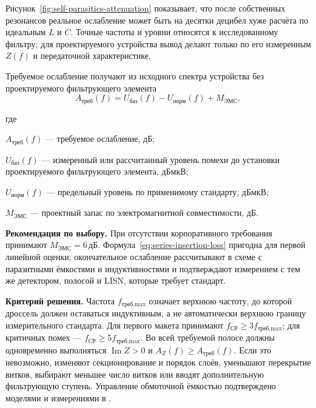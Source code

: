 \documentclass[14pt,a4paper]{extarticle}
\newcommand{\recommend}{\par\noindent\textbf{Рекомендация по выбору.} }
\newcommand{\criterion}{\par\noindent\textbf{Критерий решения.} }
\newenvironment{whereblock}
 {\par\noindent где\par
  \begin{list}{}{\setlength{\leftmargin}{12.5mm}
                  \setlength{\itemindent}{-12.5mm}
                  \setlength{\itemsep}{0pt}
                  \setlength{\parsep}{0pt}
                  \setlength{\topsep}{0pt}}}
 {\end{list}}
\newcommand{\whereitem}[2]{\item[] #1 --- #2}
\begin{document}
Рисунок~\ref{fig:self-parasitics-attenuation} показывает, что после
собственных резонансов реальное ослабление может быть на десятки децибел
хуже расчёта по идеальным $L$ и $C$. Точные частоты и уровни относятся к
исследованному фильтру; для проектируемого устройства вывод делают только
по его измеренным $Z(f)$ и передаточной характеристике.

Требуемое ослабление получают из исходного спектра устройства без
проектируемого фильтрующего элемента
\begin{equation}
 A_{\text{треб}}(f)=
 U_{\text{баз}}(f)-U_{\text{норм}}(f)+M_{\text{ЭМС}},
 \label{eq:required-attenuation}
\end{equation}
\begin{whereblock}
\whereitem{$A_{\text{треб}}(f)$}{требуемое ослабление, дБ;}
\whereitem{$U_{\text{баз}}(f)$}{измеренный или рассчитанный уровень помехи
до установки проектируемого фильтрующего элемента, дБмкВ;}
\whereitem{$U_{\text{норм}}(f)$}{предельный уровень по применимому
стандарту, дБмкВ;}
\whereitem{$M_{\text{ЭМС}}$}{проектный запас по электромагнитной
совместимости, дБ.}
\end{whereblock}

\recommend При отсутствии корпоративного требования принимают
$M_{\text{ЭМС}}=6\,\text{дБ}$. Формула~\eqref{eq:series-insertion-loss}
пригодна для первой линейной оценки; окончательное ослабление рассчитывают в
схеме с паразитными ёмкостями и индуктивностями и подтверждают измерением с
тем же детектором, полосой и LISN, которые требует стандарт.

\criterion Частота $f_{\text{треб,max}}$ означает верхнюю частоту, до которой
дроссель должен оставаться индуктивным, а не автоматически верхнюю границу
измерительного стандарта. Для первого макета принимают
$f_{\text{СР}}\geq3f_{\text{треб,max}}$; для критичных помех ---
$f_{\text{СР}}\geq5f_{\text{треб,max}}$. Во всей требуемой полосе должны
одновременно выполняться $\operatorname{Im}Z>0$ и
$A_Z(f)\geq A_{\text{треб}}(f)$. Если это невозможно, изменяют секционирование
и порядок слоёв, уменьшают перекрытие витков, выбирают меньшее число витков
или вводят дополнительную фильтрующую ступень. Управление обмоточной
ёмкостью подтверждено моделями и измерениями в
\cite{zhao,heldwein}.
\end{document}
